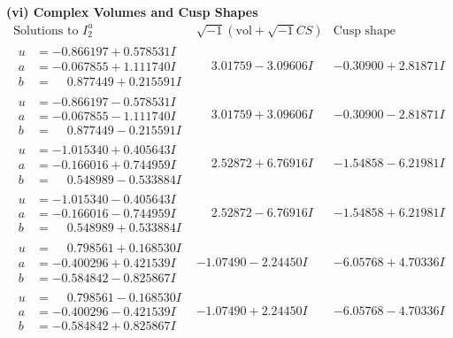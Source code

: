 \documentclass[1p]{elsarticle_modified}
\theoremstyle{definition}
\newcommand{\I}{\sqrt{-1}}
\begin{document}
\newpage\flushleft \textbf{(vi) Complex Volumes and Cusp Shapes}
$$\begin{array}{c|c|c}  
\text{Solutions to }I^u_{2}& \I (\text{vol} + \sqrt{-1}CS) & \text{Cusp shape}\\
 \hline 
\begin{aligned}
u &= -0.866197 + 0.578531 I \\
a &= -0.067855 + 1.111740 I \\
b &= \phantom{-}0.877449 + 0.215591 I\end{aligned}
 & \phantom{-}3.01759 - 3.09606 I & -0.30900 + 2.81871 I \\ \hline\begin{aligned}
u &= -0.866197 - 0.578531 I \\
a &= -0.067855 - 1.111740 I \\
b &= \phantom{-}0.877449 - 0.215591 I\end{aligned}
 & \phantom{-}3.01759 + 3.09606 I & -0.30900 - 2.81871 I \\ \hline\begin{aligned}
u &= -1.015340 + 0.405643 I \\
a &= -0.166016 + 0.744959 I \\
b &= \phantom{-}0.548989 - 0.533884 I\end{aligned}
 & \phantom{-}2.52872 + 6.76916 I & -1.54858 - 6.21981 I \\ \hline\begin{aligned}
u &= -1.015340 - 0.405643 I \\
a &= -0.166016 - 0.744959 I \\
b &= \phantom{-}0.548989 + 0.533884 I\end{aligned}
 & \phantom{-}2.52872 - 6.76916 I & -1.54858 + 6.21981 I \\ \hline\begin{aligned}
u &= \phantom{-}0.798561 + 0.168530 I \\
a &= -0.400296 + 0.421539 I \\
b &= -0.584842 - 0.825867 I\end{aligned}
 & -1.07490 - 2.24450 I & -6.05768 + 4.70336 I \\ \hline\begin{aligned}
u &= \phantom{-}0.798561 - 0.168530 I \\
a &= -0.400296 - 0.421539 I \\
b &= -0.584842 + 0.825867 I\end{aligned}
 & -1.07490 + 2.24450 I & -6.05768 - 4.70336 I \\ \hline\begin{aligned}

\end{aligned}
\end{array}$$
\end{document}
